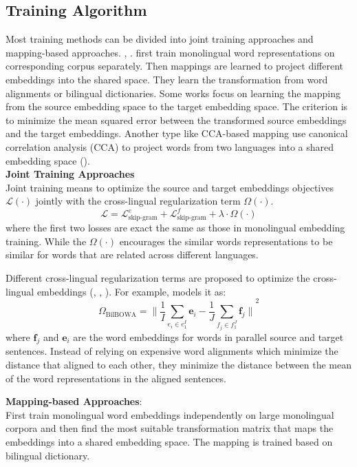 \subsection{Training Algorithm}
Most training methods can be divided into joint training approaches and mapping-based approaches. , .   first train monolingual word representations on corresponding corpus separately. Then mappings are learned to project different embeddings into the shared space. They learn the transformation from word alignments or bilingual dictionaries. Some works focus on learning the mapping from the source embedding space to the target embedding space. The criterion is to minimize the mean squared error between the transformed source embeddings and the target embeddings. Another type like CCA-based mapping use canonical correlation analysis (CCA) to project words from two languages into a shared embedding space (). \\
\textbf{Joint Training Approaches}\\
Joint training means to optimize the source and target embeddings objectives $\mathcal{L(\cdot)}$ jointly with the cross-lingual regularization term $\Omega(\cdot)$. 
\[ \mathcal{L} =  \mathcal{L}_{\text{skip-gram}}^e + \mathcal{L}_{\text{skip-gram}}^f + \lambda \cdot \Omega(\cdot)  \]
where the first two losses are exact the same as those in monolingual embedding training. While the $\Omega(\cdot)$  encourages the similar words representations to be similar for words that are related across different languages.

Different cross-lingual regularization terms are proposed to optimize the cross-lingual embeddings (\cite{coulmance2016trans}, \cite{luong2015bilingual}, \cite{gouws2015bilbowa}). For example, \cite{gouws2015bilbowa} models it as: 
\[ \Omega_{\text{BilBOWA}} = {\lVert \frac{1}{I}  \sum_{e_i \in e_1^I} \bm{e}_i - \frac{1}{J} \sum_{f_j \in f_1^J} \bm{f}_j\rVert}^2 \]
where $\bm{f}_j$ and $\bm{e}_i$ are the word embeddings for words in parallel source and target sentences. Instead of relying on expensive word alignments which minimize the distance that aligned to each other, they minimize the distance between the mean of the word representations in the aligned sentences. 

\textbf{Mapping-based Approaches}: \\
First train monolingual word embeddings independently on large monolingual corpora and then find the most suitable transformation matrix that maps the embeddings into a shared embedding space. The mapping is trained based on bilingual dictionary.

